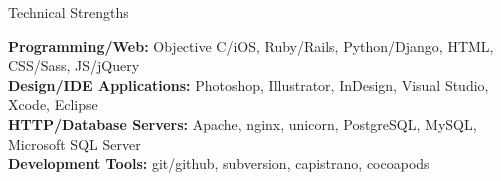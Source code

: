 \documentclass{resume} %
\begin{document}

\begin{rSection}{Technical Strengths}

\textbf{Programming/Web:} Objective  C/iOS, Ruby/Rails, Python/Django, HTML, CSS/Sass,  JS/jQuery \\
\textbf{Design/IDE Applications:} Photoshop, Illustrator, InDesign, Visual Studio, Xcode, Eclipse  \\
\textbf{HTTP/Database Servers:} Apache, nginx, unicorn, PostgreSQL, MySQL, Microsoft SQL Server  \\
\textbf{Development Tools:} git/github, subversion, capistrano, cocoapods

\end{rSection}

\end{document}
